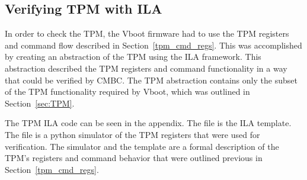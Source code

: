 
\subsection{Verifying TPM with ILA}   

In order to check the TPM, the Vboot firmware had to use the TPM registers and
command flow described in Section~\ref{tpm_cmd_regs}.
This was accomplished by creating an abstraction of the TPM using the ILA framework.
This abstraction described the TPM registers and command functionality in a way that could be verified by CMBC\@.
The TPM abstraction contains only the subset of the TPM functionality required by Vboot, which was outlined in Section~\ref{sec:TPM}.

The TPM ILA code can be seen in the appendix.
The file  is the ILA template.
The file  is a python simulator of the TPM registers that
were  used for verification.
The simulator and the template are a formal description of the TPM's registers and command behavior that were outlined previous in Section~\ref{tpm_cmd_regs}. 
